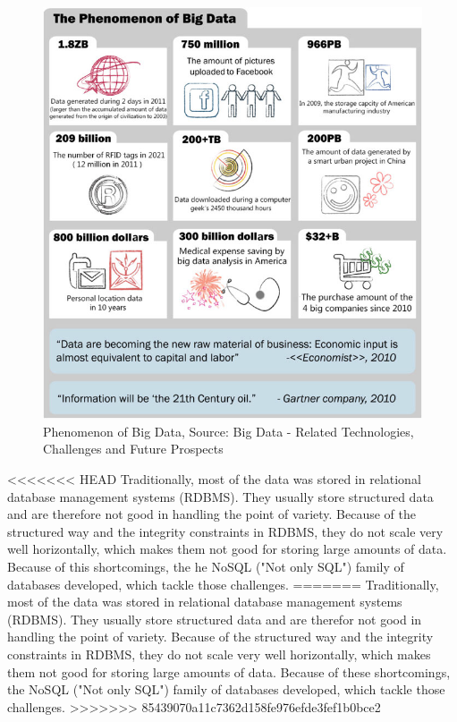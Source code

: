 \documentclass{acm_proc_article-sp}
\begin{document}
\begin{figure}[hbtp]
	\centering
	\includegraphics[scale=0.45]{big_data.png}
	\caption{Phenomenon of Big Data, Source: Big Data - Related Technologies, Challenges and Future Prospects\cite{DBLP:series/sbcs/ChenMZL14}}
\end{figure}

<<<<<<< HEAD
Traditionally, most of the data was stored in relational database management systems (RDBMS). They usually store structured data and are therefore not good in handling the point of variety. Because of the structured way and the integrity constraints in RDBMS, they do not scale very well horizontally, which makes them not good for storing large amounts of data. Because of this shortcomings, the he NoSQL ("Not only SQL") family of databases developed, which tackle those challenges.
=======
Traditionally, most of the data was stored in relational database management systems (RDBMS). They usually store structured data and are therefor not good in handling the point of variety. Because of the structured way and the integrity constraints in RDBMS, they do not scale very well horizontally, which makes them not good for storing large amounts of data. Because of these shortcomings, the NoSQL ("Not only SQL") family of databases developed, which tackle those challenges.
>>>>>>> 85439070a11c7362d158fe976efde3fef1b0bce2
\end{document}

